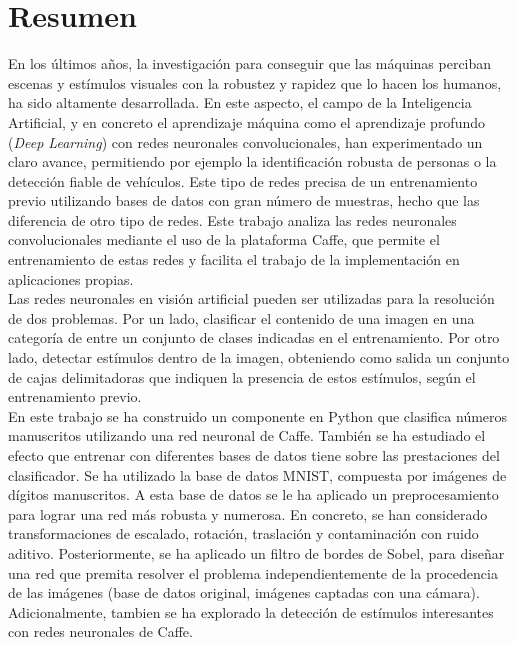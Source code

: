 \chapter*{Resumen}

En los últimos años, la investigación para conseguir que las máquinas perciban escenas y estímulos visuales con la robustez y rapidez que lo hacen los humanos, ha sido altamente desarrollada. En este aspecto, el campo de la Inteligencia Artificial, y en concreto el aprendizaje máquina como el aprendizaje profundo (\textit{Deep Learning}) con redes neuronales convolucionales, han experimentado un claro avance, permitiendo por ejemplo la identificación robusta de personas o la detección fiable de vehículos. Este tipo de redes precisa de un entrenamiento previo utilizando bases de datos con gran número de muestras, hecho que las diferencia de otro tipo de redes. Este trabajo analiza las redes neuronales convolucionales mediante el uso de la plataforma Caffe, que permite el entrenamiento de estas redes y facilita el trabajo de la implementación en aplicaciones propias.\\

Las redes neuronales en visión artificial pueden ser utilizadas para la resolución de dos problemas. Por un lado, clasificar el contenido de una imagen en una categoría de entre un conjunto de clases indicadas en el entrenamiento. Por otro lado, detectar estímulos dentro de la imagen, obteniendo como salida un conjunto de cajas delimitadoras que indiquen la presencia de estos estímulos, según el entrenamiento previo.\\

En este trabajo se ha construido un componente en Python que clasifica números manuscritos utilizando una red neuronal de Caffe. También se ha estudiado el efecto que entrenar con diferentes bases de datos tiene sobre las prestaciones del clasificador. Se ha utilizado la base de datos MNIST, compuesta por imágenes de dígitos manuscritos. A esta base de datos se le ha aplicado un preprocesamiento para lograr una red más robusta y numerosa. En concreto, se han considerado transformaciones de escalado, rotación, traslación y contaminación con ruido aditivo. Posteriormente, se ha aplicado un filtro de bordes de Sobel, para diseñar una red que premita resolver el problema independientemente de la procedencia de las imágenes (base de datos original, imágenes captadas con una cámara). Adicionalmente, tambien se ha explorado la detección de estímulos interesantes con redes neuronales de Caffe.